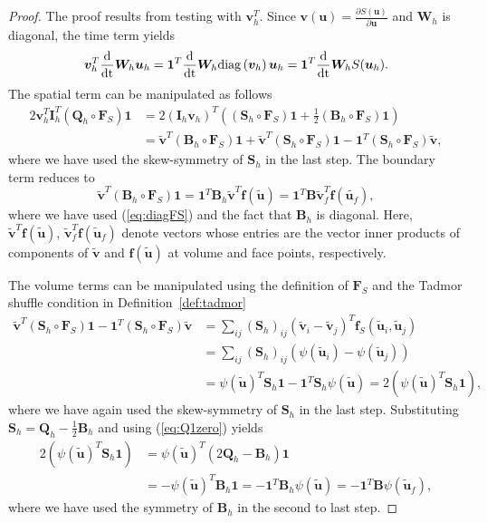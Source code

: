 \documentclass[review,onefignum,onetabnum,final]{siamart171218}
\renewcommand{\tilde}{\widetilde}
\newcommand{\td}[2]{\frac{{\rm d}#1}{{\rm d}{\rm #2}}}
\newcommand{\pd}[2]{\frac{\partial#1}{\partial#2}}
\newcommand{\LRp}[1]{\left( #1 \right)}
\newcommand{\diag}[1]{{\rm diag}\LRp{#1}}
\begin{document}
\begin{proof}
The proof results from testing with $\bm{v}_h^T$.  Since $\bm{v}(\bm{u}) = \pd{S(\bm{u})}{\bm{u}}$ and $\bm{W}_h$ is diagonal, the time term yields
\[
\bm{v}_h^T\td{}{t}\bm{W}_h\bm{u}_h = \bm{1}^T \td{}{t}\bm{W}_h\diag{\bm{v}_h}\bm{u}_h = \bm{1}^T\td{}{t}\bm{W}_h S(\bm{u}_h).
\]
The spatial term can be manipulated as follows
\begin{align*}
2\bm{v}_h^T \bm{I}_h^T\LRp{\bm{Q}_h \circ \bm{F}_S}\bm{1} &= 2\LRp{\bm{I}_h\bm{v}_h}^T \LRp{\LRp{\bm{S}_h \circ \bm{F}_S}\bm{1} + \frac{1}{2}\LRp{\bm{B}_h \circ \bm{F}_S}\bm{1}}\\
&= \tilde{\bm{v}}^T\LRp{\bm{B}_h \circ \bm{F}_S}\bm{1} + \tilde{\bm{v}}^T \LRp{\bm{S}_h \circ \bm{F}_S}\bm{1} - \bm{1}^T \LRp{\bm{S}_h \circ \bm{F}_S}\tilde{\bm{v}},
\end{align*}
where we have used the skew-symmetry of $\bm{S}_h$ in the last step.  The boundary term reduces to 
\[
\tilde{\bm{v}}^T\LRp{\bm{B}_h \circ \bm{F}_S}\bm{1} = \bm{1}^T\bm{B}_h\tilde{\bm{v}}^T\bm{f}\LRp{\tilde{\bm{u}}}= \bm{1}^T\bm{B}\tilde{\bm{v}}_f^T\bm{f}\LRp{\tilde{\bm{u}_f}},
\]
where we have used (\ref{eq:diagFS}) and the fact that $\bm{B}_h$ is diagonal.  Here, $\tilde{\bm{v}}^T\bm{f}\LRp{\tilde{\bm{u}}}$, $\tilde{\bm{v}}_f^T\bm{f}\LRp{\tilde{\bm{u}}_f}$ denote vectors whose entries are the vector inner products of components of $\tilde{\bm{v}}$ and $\bm{f}\LRp{\tilde{\bm{u}}}$ at volume and face points, respectively.  

The volume terms can be manipulated using the definition of $\bm{F}_S$ and the Tadmor shuffle condition in Definition~\ref{def:tadmor}
\begin{align*}
\tilde{\bm{v}}^T \LRp{\bm{S}_h \circ \bm{F}_S} \bm{1} - \bm{1}^T \LRp{\bm{S}_h \circ \bm{F}_S}\tilde{\bm{v}} 
&= \sum_{ij} \LRp{\bm{S}_h}_{ij} \LRp{\tilde{\bm{v}}_i - \tilde{\bm{v}}_j}^T\bm{f}_S\LRp{\tilde{\bm{u}}_i,\tilde{\bm{u}}_j}\\
&= \sum_{ij} \LRp{\bm{S}_h}_{ij} \LRp{\psi\LRp{\tilde{\bm{u}}_i} - \psi\LRp{\tilde{\bm{u}}_j}}\\
&= \psi\LRp{\tilde{\bm{u}}}^T \bm{S}_h \bm{1}- \bm{1}^T \bm{S}_h \psi\LRp{\tilde{\bm{u}}} = 2\LRp{ \psi\LRp{\tilde{\bm{u}}}^T\bm{S}_h\bm{1}},
\end{align*}
where we have again used the skew-symmetry of $\bm{S}_h$ in the last step.  Substituting $\bm{S}_h = \bm{Q}_h - \frac{1}{2}\bm{B}_h$ and using (\ref{eq:Q1zero}) yields
\begin{align*} 
2\LRp{ \psi\LRp{\tilde{\bm{u}}}^T\bm{S}_h\bm{1}} &= \psi\LRp{\tilde{\bm{u}}}^T\LRp{2\bm{Q}_h - \bm{B}_h} \bm{1} \\
&=-\psi\LRp{\tilde{\bm{u}}}^T\bm{B}_h \bm{1}  = -\bm{1}^T\bm{B}_h \psi\LRp{\tilde{\bm{u}}} =  -\bm{1}^T\bm{B} \psi\LRp{\tilde{\bm{u}}_f}, 
\end{align*} 
where we have used the symmetry of $\bm{B}_h$ in the second to last step.
\end{proof}
\end{document}

